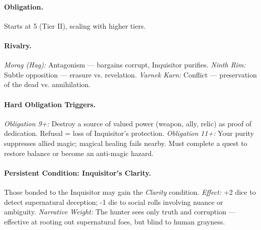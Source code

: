 \paragraph{Obligation.} 
Starts at 5 (Tier II), scaling with higher tiers.

\paragraph{Rivalry.} 
\emph{Morag (Hag):} Antagonism --- bargains corrupt, Inquisitor purifies.  
\emph{Ninth Rim:} Subtle opposition --- erasure vs. revelation.  
\emph{Varnek Karn:} Conflict --- preservation of the dead vs. annihilation.

\paragraph{Hard Obligation Triggers.}  
\emph{Obligation 9+:} Destroy a source of valued power (weapon, ally, relic) as proof of dedication. Refusal = loss of Inquisitor’s protection.  
\emph{Obligation 11+:} Your purity suppresses allied magic; magical healing fails nearby. Must complete a quest to restore balance or become an anti-magic hazard.

\paragraph{Persistent Condition: Inquisitor’s Clarity.}  
Those bonded to the Inquisitor may gain the \emph{Clarity} condition.  
\emph{Effect:} +2 dice to detect supernatural deception; -1 die to social rolls involving nuance or ambiguity.  
\emph{Narrative Weight:} The hunter sees only truth and corruption --- effective at rooting out supernatural foes, but blind to human grayness.
